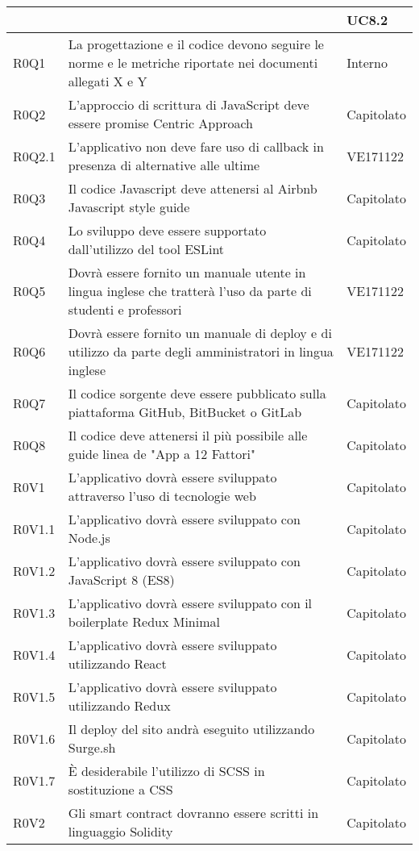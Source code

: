 \documentclass[AnalisiDeiRequisiti.tex]{subfiles}
\begin{document}
\begin{longtable}[H]{|p{2cm}|p{5cm}|p{5cm}|}
	& & UC8.2 \\ \hline
	R0Q1 &  La progettazione e il codice devono seguire le norme e le metriche riportate nei documenti allegati X e Y & Interno \\ \hline
	R0Q2 &  L'approccio di scrittura di JavaScript deve essere promise Centric Approach & Capitolato \\ \hline
	R0Q2.1 &  L'applicativo non deve fare uso di callback in presenza di alternative alle ultime & VE171122 \\ \hline
	R0Q3 &  Il codice Javascript deve attenersi al Airbnb Javascript style guide & Capitolato \\ \hline
	R0Q4 &  Lo sviluppo deve essere supportato dall'utilizzo del tool ESLint & Capitolato \\ \hline
	R0Q5 &  Dovrà essere fornito un manuale utente in lingua inglese che tratterà l'uso da parte di studenti e professori & VE171122 \\ \hline
	R0Q6 &  Dovrà essere fornito un manuale di deploy e di utilizzo da parte degli amministratori in lingua inglese & VE171122 \\ \hline
	R0Q7 &  Il codice sorgente deve essere pubblicato sulla piattaforma GitHub, BitBucket o GitLab & Capitolato \\ \hline
	R0Q8 &  Il codice deve attenersi il più possibile alle guide linea de "App a 12 Fattori" & Capitolato \\ \hline
	R0V1 &  L'applicativo dovrà essere sviluppato attraverso l'uso di tecnologie web & Capitolato \\ \hline
	R0V1.1 &  L'applicativo dovrà essere sviluppato con Node.js & Capitolato \\ \hline
	R0V1.2 &  L'applicativo dovrà essere sviluppato con JavaScript 8 (ES8) & Capitolato \\ \hline
	R0V1.3 &  L'applicativo dovrà essere sviluppato con il boilerplate Redux Minimal & Capitolato \\ \hline
	R0V1.4 &  L'applicativo dovrà essere sviluppato utilizzando React & Capitolato \\ \hline
	R0V1.5 &  L'applicativo dovrà essere sviluppato utilizzando Redux & Capitolato \\ \hline
	R0V1.6 &  Il deploy del sito andrà eseguito utilizzando Surge.sh & Capitolato \\ \hline
	R0V1.7 &  È desiderabile l'utilizzo di SCSS in sostituzione a CSS & Capitolato \\ \hline
	R0V2 &  Gli smart contract dovranno essere scritti in linguaggio Solidity & Capitolato \\ \hline

\end{longtable}
\end{document}
